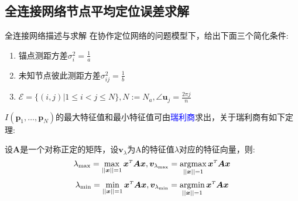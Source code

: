 \subsection{全连接网络节点平均定位误差求解}
{全连接网络描述与求解}
在协作定位网络的问题模型下，给出下面三个简化条件:
\begin{enumerate}
\item 锚点测距方差$\sigma_i^2=\frac{1}{a}$
\item 未知节点彼此测距方差$\sigma^2_{ij}=\frac{1}{b}$
\item $\mathcal{E}=\{(i,j)|1\leq i <j\leq N\},N:=N_a,\angle\bm{u}_j=\frac{2\pi j}{n}$
\end{enumerate}
$I(\bm{p}_1,\dots,\bm{p}_N)$的最大特征值和最小特征值可由\textcolor{blue}{瑞利商}求出，关于瑞利商有如下定理:
\begin{theorem}\label{theorem:rayleigh}
  设$\bm{A}$是一个对称正定的矩阵，设$\bm{v}_{\lambda}$为A的特征值$\lambda$对应的特征向量，则:
\[
\displaystyle\lambda_{\text{max}}=\max_{||\bm{x}||=1} \bm{x}^{\scriptscriptstyle T}\bm{A}\bm{x},\bm{v}_{\lambda_{\text{max}}}=\operatorname*{argmax}_{||\bm{x}||=1} \bm{x}^{\scriptscriptstyle T}\bm{A}\bm{x}
\]\[
\displaystyle\lambda_{\text{min}}=\min_{||\bm{x}||=1} \bm{x}^{\scriptscriptstyle T}\bm{A}\bm{x},\bm{v}_{\lambda_{\text{min}}}=\operatorname*{argmin}_{||\bm{x}||=1} \bm{x}^{\scriptscriptstyle T}\bm{A}\bm{x}
\]
\end{theorem}


